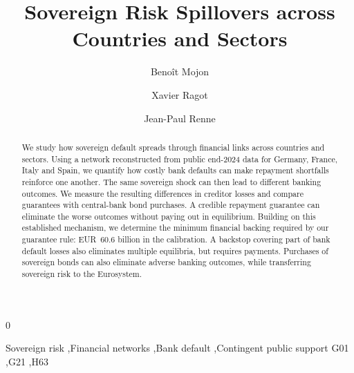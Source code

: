 \documentclass[preprint,12pt,authoryear]{elsarticle}
\def\isAnonymous{0}
\begin{document}
\begin{frontmatter}


\title{Sovereign Risk Spillovers across Countries and Sectors}


\if\isAnonymous0

\author[insta]{Beno\^it Mojon}

\author[instb]{Xavier Ragot}

\author[instc]{Jean-Paul Renne}

\fi


\begin{abstract}
We study how sovereign default spreads through financial links across countries and sectors. Using a network reconstructed from public end-2024 data for Germany, France, Italy and Spain, we quantify how costly bank defaults can make repayment shortfalls reinforce one another. The same sovereign shock can then lead to different banking outcomes. We measure the resulting differences in creditor losses and compare guarantees with central-bank bond purchases. A credible repayment guarantee can eliminate the worse outcomes without paying out in equilibrium. Building on this established mechanism, we determine the minimum financial backing required by our guarantee rule: EUR~60.6 billion in the calibration. A backstop covering part of bank default losses also eliminates multiple equilibria, but requires payments. Purchases of sovereign bonds can also eliminate adverse banking outcomes, while transferring sovereign risk to the Eurosystem.
\end{abstract}


\begin{keyword}
Sovereign risk \sep Financial networks \sep Bank default \sep Contingent public support
\JEL G01 \sep G21 \sep H63
\end{keyword}

\end{frontmatter}
\end{document}
